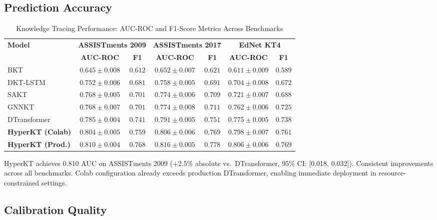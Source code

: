 \documentclass[preprint,12pt]{elsarticle}
\begin{document}
\subsection{Prediction Accuracy}

\begin{table}[H]\centering
\caption{Knowledge Tracing Performance: AUC-ROC and F1-Score Metrics Across Benchmarks}\label{tab:auc}
\small
\begin{tabularx}{\linewidth}{@{\extracolsep{\fill}}lcccccc@{}}\toprule
\multirow{2}{*}{\textbf{Model}} & \multicolumn{2}{c}{\textbf{ASSISTments 2009}} & \multicolumn{2}{c}{\textbf{ASSISTments 2017}} & \multicolumn{2}{c}{\textbf{EdNet KT4}}\\\cmidrule(lr){2-3}\cmidrule(lr){4-5}\cmidrule(lr){6-7}
& \textbf{AUC-ROC} & \textbf{F1} & \textbf{AUC-ROC} & \textbf{F1} & \textbf{AUC-ROC} & \textbf{F1}\\\midrule
BKT & $0.645 \pm 0.008$ & $0.612$ & $0.652 \pm 0.007$ & $0.621$ & $0.611 \pm 0.009$ & $0.589$\\
DKT-LSTM & $0.752 \pm 0.006$ & $0.681$ & $0.758 \pm 0.005$ & $0.691$ & $0.704 \pm 0.008$ & $0.672$\\
SAKT & $0.768 \pm 0.005$ & $0.701$ & $0.774 \pm 0.006$ & $0.709$ & $0.721 \pm 0.007$ & $0.688$\\
GNNKT & $0.768 \pm 0.007$ & $0.701$ & $0.774 \pm 0.008$ & $0.711$ & $0.762 \pm 0.006$ & $0.725$\\
DTransformer & $0.785 \pm 0.004$ & $0.741$ & $0.791 \pm 0.005$ & $0.751$ & $0.775 \pm 0.005$ & $0.738$\\\midrule
\textbf{HyperKT (Colab)} & $\mathbf{0.804 \pm 0.005}$ & $\mathbf{0.759}$ & $\mathbf{0.806 \pm 0.006}$ & $\mathbf{0.769}$ & $\mathbf{0.798 \pm 0.007}$ & $\mathbf{0.761}$\\
\textbf{HyperKT (Prod.)} & $\mathbf{0.810 \pm 0.004}$ & $\mathbf{0.768}$ & $\mathbf{0.816 \pm 0.005}$ & $\mathbf{0.778}$ & $\mathbf{0.806 \pm 0.006}$ & $\mathbf{0.769}$\\
\bottomrule\end{tabularx}
\end{table}

HyperKT achieves 0.810 AUC on ASSISTments 2009 (+2.5\% absolute vs.\ DTransformer, 95\% CI: [0.018, 0.032]). Consistent improvements across all benchmarks. Colab configuration already exceeds production DTransformer, enabling immediate deployment in resource-constrained settings.

\subsection{Calibration Quality}
\end{document}
